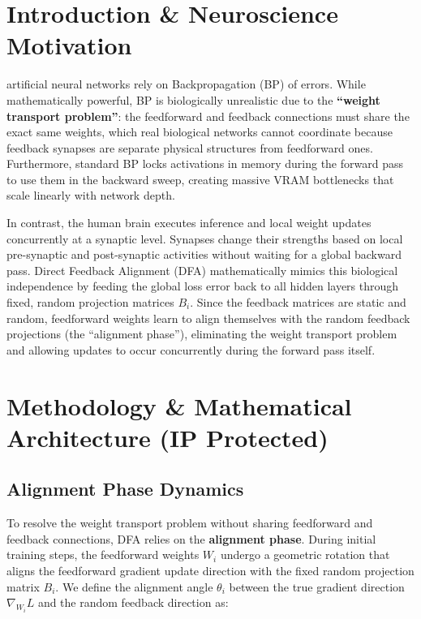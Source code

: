 \documentclass[10pt,journal,compsoc]{IEEEtran}
\begin{document}
\IEEEdisplaynfonttitleabstractindextext
\IEEEpeerreviewmaketitle

\section{Introduction \& Neuroscience Motivation}
 artificial neural networks rely on Backpropagation (BP) of errors. While mathematically powerful, BP is biologically unrealistic due to the \textbf{``weight transport problem''}: the feedforward and feedback connections must share the exact same weights, which real biological networks cannot coordinate because feedback synapses are separate physical structures from feedforward ones. Furthermore, standard BP locks activations in memory during the forward pass to use them in the backward sweep, creating massive VRAM bottlenecks that scale linearly with network depth.

In contrast, the human brain executes inference and local weight updates concurrently at a synaptic level. Synapses change their strengths based on local pre-synaptic and post-synaptic activities without waiting for a global backward pass. Direct Feedback Alignment (DFA) mathematically mimics this biological independence by feeding the global loss error back to all hidden layers through fixed, random projection matrices $B_i$. Since the feedback matrices are static and random, feedforward weights learn to align themselves with the random feedback projections (the ``alignment phase''), eliminating the weight transport problem and allowing updates to occur concurrently during the forward pass itself.

\section{Methodology \& Mathematical Architecture (IP Protected)}

\subsection{Alignment Phase Dynamics}
To resolve the weight transport problem without sharing feedforward and feedback connections, DFA relies on the \textbf{alignment phase}. During initial training steps, the feedforward weights $W_i$ undergo a geometric rotation that aligns the feedforward gradient update direction with the fixed random projection matrix $B_i$. We define the alignment angle $\theta_i$ between the true gradient direction $\nabla_{W_i} L$ and the random feedback direction as:
\end{document}
